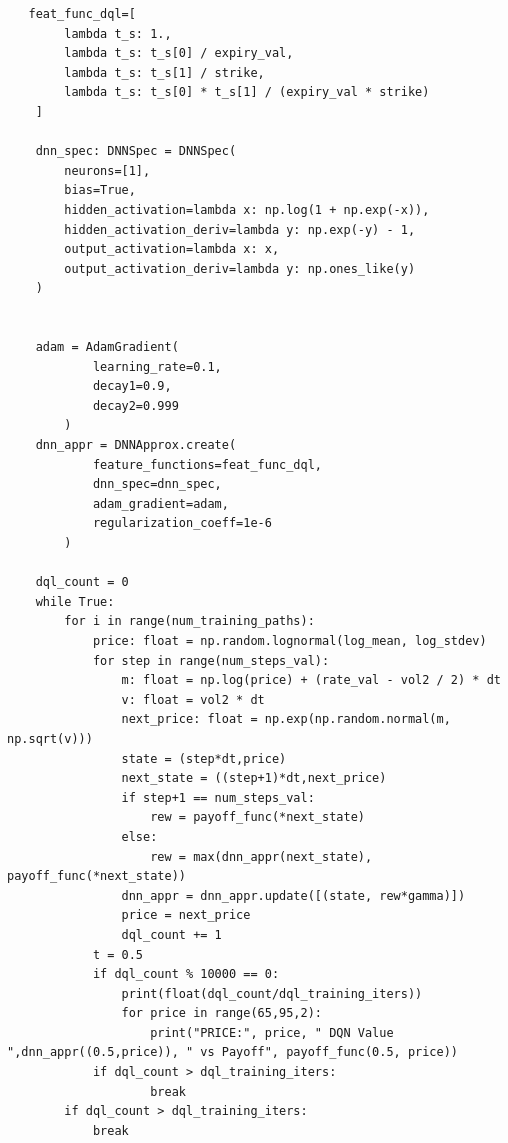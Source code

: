 \documentclass{article}[12pt]
\begin{document}
\begin{lstlisting}
   feat_func_dql=[
        lambda t_s: 1.,
        lambda t_s: t_s[0] / expiry_val,
        lambda t_s: t_s[1] / strike,
        lambda t_s: t_s[0] * t_s[1] / (expiry_val * strike)
    ]

    dnn_spec: DNNSpec = DNNSpec(
        neurons=[1],
        bias=True,
        hidden_activation=lambda x: np.log(1 + np.exp(-x)),
        hidden_activation_deriv=lambda y: np.exp(-y) - 1,
        output_activation=lambda x: x,
        output_activation_deriv=lambda y: np.ones_like(y)
    )


    adam = AdamGradient(
            learning_rate=0.1,
            decay1=0.9,
            decay2=0.999
        )
    dnn_appr = DNNApprox.create(
            feature_functions=feat_func_dql,
            dnn_spec=dnn_spec,
            adam_gradient=adam,
            regularization_coeff=1e-6
        )

    dql_count = 0 
    while True:
        for i in range(num_training_paths):
            price: float = np.random.lognormal(log_mean, log_stdev)
            for step in range(num_steps_val):
                m: float = np.log(price) + (rate_val - vol2 / 2) * dt
                v: float = vol2 * dt
                next_price: float = np.exp(np.random.normal(m, np.sqrt(v)))
                state = (step*dt,price)
                next_state = ((step+1)*dt,next_price)
                if step+1 == num_steps_val:
                    rew = payoff_func(*next_state)
                else:
                    rew = max(dnn_appr(next_state), payoff_func(*next_state))
                dnn_appr = dnn_appr.update([(state, rew*gamma)])
                price = next_price
                dql_count += 1
            t = 0.5
            if dql_count % 10000 == 0:
                print(float(dql_count/dql_training_iters))
                for price in range(65,95,2):
                    print("PRICE:", price, " DQN Value ",dnn_appr((0.5,price)), " vs Payoff", payoff_func(0.5, price))
            if dql_count > dql_training_iters:
                    break
        if dql_count > dql_training_iters:
            break

\end{lstlisting}
\end{document}
